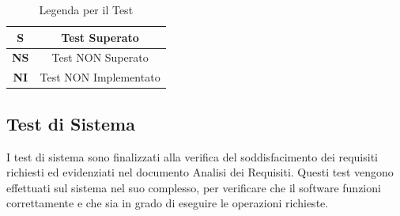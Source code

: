 \documentclass{article}
\begin{document}
\begin{table}[H]
    \centering
    \renewcommand{\arraystretch}{1.5}
\begin{tabular}{|c|c|}
    \hline
    \textbf{S} & Test Superato \\
    \hline
    \textbf{NS} & Test NON Superato \\
    \hline
    \textbf{NI} & Test NON Implementato \\
    \hline
\end{tabular}
\caption{Legenda per il Test}
\end{table}


\subsection{Test di Sistema} %
I test di sistema sono finalizzati alla verifica del soddisfacimento dei requisiti richiesti ed evidenziati nel documento
Analisi dei Requisiti. Questi test vengono effettuati sul sistema nel suo complesso, per verificare che il software funzioni correttamente
e che sia in grado di eseguire le operazioni richieste.

\renewcommand{\arraystretch}{1.5}  %
\end{document}
